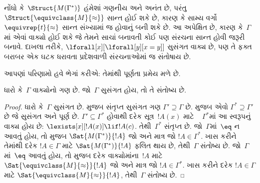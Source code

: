 
\begin{digress}
નોંધો કે~$\Struct{M(\Gamma^*)}$ હંમેશાં ગણનીય અને અનંત છે,
પરંતુ~$\Struct{\equivclass{M}{\approx}}$ સાન્ત હોઈ શકે છે, કારણ કે
સામ્ય વર્ગો~$\equivrep{t}{\approx}$ સાન્ત સંખ્યામાં જ હોવાનું બની શકે
છે. આ અપેક્ષિત છે, કારણ કે~$\Gamma$માં એવાં વાક્યો હોઈ શકે જે
તેમને સાચાં બનાવતી કોઈ પણ સંરચના સાન્ત હોવી જરૂરી બનાવે. દાખલા
તરીકે, $\lforall[x][\lforall[y][x=y]]$ સુસંગત વાક્ય છે, પણ તે
ફક્ત બરાબર એક ઘટક ધરાવતા પ્રદેશવાળી સંરચનાઓમાં જ
સંતોષાય છે.
\end{digress}
\endgroup


\begingroup
\makeatletter{}\makeatother


\label{guunit:OLP-0134}


\begin{explain}
આપણાં પરિણામો હવે ભેગાં કરીએ: તેમાંથી પૂર્ણતા પ્રમેય મળે છે.
\end{explain}

\begin{thm}[પૂર્ણતા પ્રમેય]
ધારો કે~$\Gamma$ વાક્યોનો ગણ છે. જો~$\Gamma$ સુસંગત હોય, તો તે
સંતોષ્ય છે.
\end{thm}

\begin{proof}
ધારો કે~$\Gamma$ સુસંગત છે.  મુજબ
સંતૃપ્ત સુસંગત ગણ $\Gamma'\supseteq\Gamma$ છે.
 મુજબ એવો
$\Gamma^*\supseteq\Gamma'$ છે જે સુસંગત અને
પૂર્ણ છે.
%
  $\Gamma'\subseteq\Gamma^*$ હોવાથી દરેક સૂત્ર~$!A(x)$ માટે
  ~ $\Gamma^*$માં આ સ્વરૂપનું વાક્ય હોય છે:
  $\lexists[x][!A(x)] \lif !A(c)$.
  તેથી~$\Gamma^*$ સંતૃપ્ત છે. જો~$\Gamma$માં~$\eq$ ન આવતું હોય, તો
 મુજબ
$\Sat{M(\Gamma^*)}{!A}$ જો અને માત્ર
જો $!A\in\Gamma^*$. ખાસ કરીને તેમાંથી દરેક $!A\in\Gamma$ માટે
$\Sat{M(\Gamma^*)}{!A}$ ફલિત થાય છે,
તેથી~$\Gamma$ સંતોષ્ય છે.%
  જો~$\Gamma$માં~$\eq$ આવતું હોય, તો  મુજબ દરેક
  વાક્યોમાંના~$!A$ માટે $\Sat{\equivclass{M}{\approx}}{!A}$ જો અને
  માત્ર જો $!A\in\Gamma^*$. ખાસ કરીને દરેક $!A\in\Gamma$ માટે
  $\Sat{\equivclass{M}{\approx}}{!A}$, તેથી~$\Gamma$ સંતોષ્ય છે.
\end{proof}

